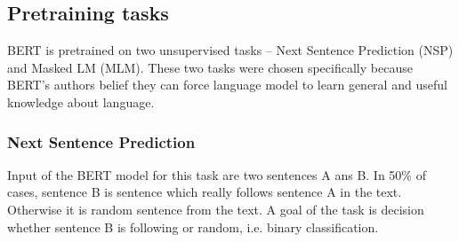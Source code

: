 \subsection{Pretraining tasks}
BERT is pretrained on two unsupervised tasks -- Next Sentence Prediction (NSP) and Masked LM (MLM). These two tasks were chosen specifically because BERT's authors belief they can force language model to learn general and useful knowledge about language. 

\subsubsection*{Next Sentence Prediction}
Input of the BERT model for this task are two sentences A ans B. In 50\% of cases, sentence B is sentence which really follows sentence A in the text. Otherwise it is random sentence from the text. A goal of the task is decision whether sentence B is following or random, i.e. binary classification.


